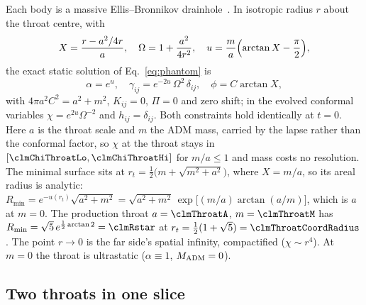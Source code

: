 \documentclass[twocolumn,floatfix,aps,prd,superscriptaddress,nofootinbib]{revtex4-2}
\begin{document}
Each body is a massive Ellis--Bronnikov drainhole~\cite{ellis1973,bronnikov1973}. In isotropic radius $r$ about the throat centre, with
\begin{equation}
X = \frac{r - a^2/4r}{a},\quad
\Omega = 1 + \frac{a^2}{4r^2},\quad
u = \frac{m}{a}\Bigl(\arctan X - \frac{\pi}{2}\Bigr),
\end{equation}
the exact static solution of Eq.~\eqref{eq:phantom} is
\begin{equation}
\alpha = e^{u},\quad
\gamma_{ij} = e^{-2u}\,\Omega^2\,\delta_{ij},\quad
\phi = C\arctan X,
\label{eq:drainhole}
\end{equation}
with $4\pi a^2C^2 = a^2+m^2$, $K_{ij}=0$, $\Pi=0$ and zero shift; in the evolved conformal variables $\chi = e^{2u}\Omega^{-2}$ and $h_{ij}=\delta_{ij}$. Both constraints hold identically at $t=0$. Here $a$ is the throat scale and $m$ the ADM mass, carried by the lapse rather than the conformal factor, so $\chi$ at the throat stays in $[\clmChiThroatLo,\clmChiThroatHi]$ for $m/a\le1$ and mass costs no resolution. The minimal surface sits at $r_t=\tfrac12\bigl(m+\sqrt{m^2+a^2}\bigr)$, where $X=m/a$, so its areal radius is analytic: $R_{\min}=e^{-u(r_t)}\sqrt{a^2+m^2}=\sqrt{a^2+m^2}\,\exp\!\bigl[(m/a)\arctan(a/m)\bigr]$, which is $a$ at $m=0$. The production throat $a=\clmThroatA$, $m=\clmThroatM$ has $R_{\min}=\sqrt5\,e^{\frac12\arctan2}=\clmRstar$ at $r_t=\tfrac12(1+\sqrt5)=\clmThroatCoordRadius$. The point $r\to0$ is the far side's spatial infinity, compactified ($\chi\sim r^4$). At $m=0$ the throat is ultrastatic ($\alpha\equiv1$, $M_{\rm ADM}=0$).

\subsection{Two throats in one slice}
\label{sec:model:binary}
\end{document}
